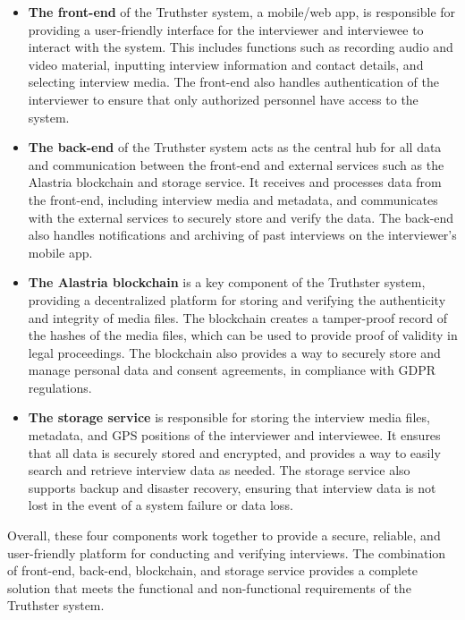 \documentclass[target=mst,aauheader=]{thud}
\begin{document}
\begin{itemize}

    \item \textbf{The front-end} of the Truthster system, a mobile/web app, is responsible for providing a user-friendly interface for the interviewer and interviewee to interact with the system. This includes functions such as recording audio and video material, inputting interview information and contact details, and selecting interview media. The front-end also handles authentication of the interviewer to ensure that only authorized personnel have access to the system.
    \item \textbf{The back-end} of the Truthster system acts as the central hub for all data and communication between the front-end and external services such as the Alastria blockchain and storage service. It receives and processes data from the front-end, including interview media and metadata, and communicates with the external services to securely store and verify the data. The back-end also handles notifications and archiving of past interviews on the interviewer's mobile app.
    \item \textbf{The Alastria blockchain} is a key component of the Truthster system, providing a decentralized platform for storing and verifying the authenticity and integrity of media files. The blockchain creates a tamper-proof record of the hashes of the media files, which can be used to provide proof of validity in legal proceedings. The blockchain also provides a way to securely store and manage personal data and consent agreements, in compliance with GDPR regulations.
    \item \textbf{The storage service} is responsible for storing the interview media files, metadata, and GPS positions of the interviewer and interviewee. It ensures that all data is securely stored and encrypted, and provides a way to easily search and retrieve interview data as needed. The storage service also supports backup and disaster recovery, ensuring that interview data is not lost in the event of a system failure or data loss.

\end{itemize}

Overall, these four components work together to provide a secure, reliable, and user-friendly platform for conducting and verifying interviews. The combination of front-end, back-end, blockchain, and storage service provides a complete solution that meets the functional and non-functional requirements of the Truthster system.
\end{document}
